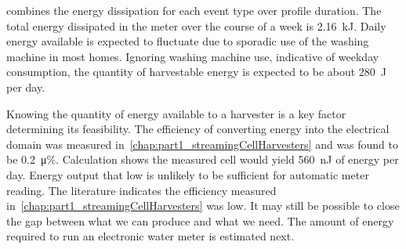      combines the energy dissipation for each event type over profile duration.
    The total energy dissipated in the meter over the course of a week is \SI{2.16}{\kilo\joule}.
    Daily energy available is expected to fluctuate due to sporadic use of the washing machine in most homes.
    Ignoring washing machine use, indicative of weekday consumption, the quantity of harvestable energy is expected to be about \SI{280}{\joule} per day.

    Knowing the quantity of energy available to a harvester is a key factor determining its feasibility.
    The efficiency of converting energy into the electrical domain was measured in~\cref{chap:part1_streamingCellHarvesters} and was found to be \SI{0.2}{\micro\percent}.
    Calculation shows the measured cell would yield \SI{560}{\nano\joule} of energy per day.
    Energy output that low is unlikely to be sufficient for automatic meter reading.
    The literature indicates the efficiency measured in~\cref{chap:part1_streamingCellHarvesters} was low.
    It may still be possible to close the gap between what we can produce and what we need.
    The amount of energy required to run an electronic water meter is estimated next.


